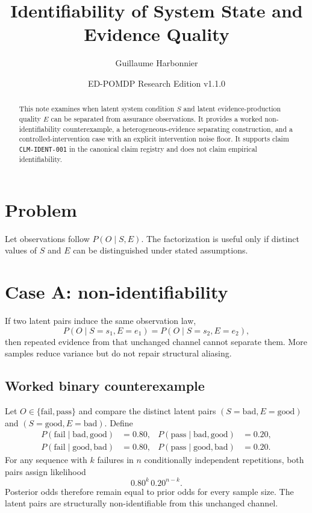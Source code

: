 \documentclass[11pt]{article}
\title{Identifiability of System State and Evidence Quality}
\author{Guillaume Harbonnier}
\date{ED-POMDP Research Edition v1.1.0}
\begin{document}
\maketitle
\begin{abstract}
This note examines when latent system condition $S$ and latent evidence-production quality $E$ can be separated from assurance observations. It provides a worked non-identifiability counterexample, a heterogeneous-evidence separating construction, and a controlled-intervention case with an explicit intervention noise floor. It supports claim \texttt{CLM-IDENT-001} in the canonical claim registry and does not claim empirical identifiability.
\end{abstract}

\section{Problem}
Let observations follow $P(O\mid S,E)$. The factorization is useful only if distinct values of $S$ and $E$ can be distinguished under stated assumptions.

\section{Case A: non-identifiability}
If two latent pairs induce the same observation law,
\[
P(O\mid S=s_1,E=e_1)=P(O\mid S=s_2,E=e_2),
\]
then repeated evidence from that unchanged channel cannot separate them. More samples reduce variance but do not repair structural aliasing.

\subsection{Worked binary counterexample}
Let $O\in\{\mathrm{fail},\mathrm{pass}\}$ and compare the distinct latent pairs $(S=\mathrm{bad},E=\mathrm{good})$ and $(S=\mathrm{good},E=\mathrm{bad})$. Define
\begin{align*}
P(\mathrm{fail}\mid \mathrm{bad},\mathrm{good}) &= 0.80, &
P(\mathrm{pass}\mid \mathrm{bad},\mathrm{good}) &= 0.20,\\
P(\mathrm{fail}\mid \mathrm{good},\mathrm{bad}) &= 0.80, &
P(\mathrm{pass}\mid \mathrm{good},\mathrm{bad}) &= 0.20.
\end{align*}
For any sequence with $k$ failures in $n$ conditionally independent repetitions, both pairs assign likelihood
\[
0.80^k\,0.20^{n-k}.
\]
Posterior odds therefore remain equal to prior odds for every sample size. The latent pairs are structurally non-identifiable from this unchanged channel.
\end{document}
